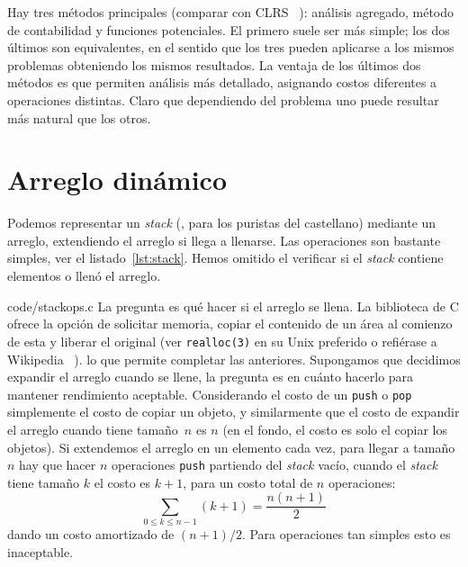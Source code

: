   Hay tres métodos principales
  (comparar con CLRS~%
     \cite[capítulo~17]{cormen09:_CLRS}):
  análisis agregado,
  método de contabilidad
  y funciones potenciales.
  El primero suele ser más simple;
  los dos últimos son equivalentes,
  en el sentido que los tres pueden aplicarse a los mismos problemas
  obteniendo los mismos resultados.
  La ventaja de los últimos dos métodos es que permiten análisis más detallado,
  asignando costos diferentes a operaciones distintas.
  Claro que dependiendo del problema
  uno puede resultar más natural que los otros.

\section{Arreglo dinámico}
\label{sec:arreglo-dinámico}

  Podemos representar un \emph{\foreignlanguage{english}{stack}}
  (, para los puristas del castellano)
  mediante un arreglo,
  extendiendo el arreglo si llega a llenarse.
  Las operaciones son bastante simples,
  ver el listado~\ref{lst:stack}.
  Hemos omitido el verificar
  si el \emph{\foreignlanguage{english}{stack}} contiene elementos
  o llenó el arreglo.
  
                  {code/stackops.c}
  La pregunta es qué hacer si el arreglo se llena.
  La biblioteca de C ofrece la opción de solicitar memoria,
  copiar el contenido de un área al comienzo de esta y liberar el original
  (ver \verb+realloc(3)+ en su Unix preferido
   o refiérase a Wikipedia~%
     \cite{wikipedia16:_c_standard_library}).
  lo que permite completar las anteriores.
  Supongamos que decidimos expandir el arreglo cuando se llene,
  la pregunta es en cuánto hacerlo para mantener rendimiento aceptable.
  Considerando el costo de un \lstinline!push! o \lstinline!pop!
  simplemente el costo de copiar un objeto,
  y similarmente que el costo de expandir el arreglo cuando tiene tamaño~\(n\)
  es \(n\)
  (en el fondo,
   el costo es solo el copiar los objetos).
  Si extendemos el arreglo en un elemento cada vez,
  para llegar a tamaño \(n\) hay que hacer \(n\) operaciones \lstinline!push!
  partiendo del \emph{\foreignlanguage{english}{stack}} vacío,
  cuando el \emph{\foreignlanguage{english}{stack}} tiene tamaño \(k\)
  el costo es \(k + 1\),
  para un costo total de \(n\) operaciones:
  \begin{equation*}
    \sum_{0 \le k \le n - 1} (k + 1)
      = \frac{n (n + 1)}{2}
  \end{equation*}
  dando un costo amortizado de \((n + 1) / 2\).
  Para operaciones tan simples esto es inaceptable.

